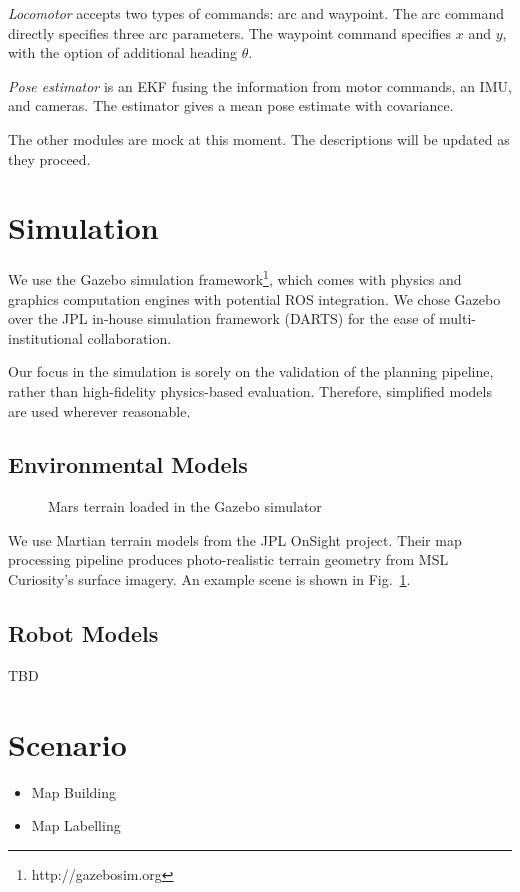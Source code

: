 \documentclass[conference]{IEEEtran}
\begin{document}
\textit{Locomotor} accepts two types of commands: arc and waypoint. The arc command directly specifies three arc parameters. The waypoint command specifies $x$ and $y$, with the option of additional heading $\theta$. 

\textit{Pose estimator} is an EKF fusing the information from motor commands, an IMU, and cameras. The estimator gives a mean pose estimate with covariance.


The other modules are mock at this moment. The descriptions will be updated as they proceed. 



\section{Simulation}

We use the Gazebo simulation framework\footnote{http://gazebosim.org}, which comes with physics and graphics computation engines with potential ROS integration. We chose Gazebo over the JPL in-house simulation framework (DARTS) for the ease of multi-institutional collaboration. 

Our focus in the simulation is sorely on the validation of the planning pipeline, rather than high-fidelity physics-based evaluation. Therefore, simplified models are used wherever reasonable.

\subsection{Environmental Models}

\begin{figure}
    \centering
    \caption{Mars terrain loaded in the Gazebo simulator}
    \label{fig:gazebo_scene}
\end{figure}

We use Martian terrain models from the JPL OnSight project. Their map processing pipeline produces photo-realistic terrain geometry from MSL Curiosity's surface imagery. An example scene is shown in Fig.~\ref{fig:gazebo_scene}.

\subsection{Robot Models}
TBD

\section{Scenario}
\begin{itemize}
  \item Map Building
  \item Map Labelling
\end{itemize}
\end{document}
